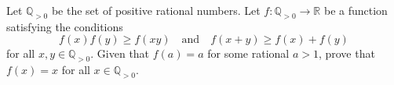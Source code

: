 Let $\mathbb{Q}_{>0}$ be the set of positive rational numbers. Let $f \colon \mathbb{Q}_{>0} \to \mathbb{R}$ be a function satisfying the conditions
\[
f(x)f(y) \geq f(xy) \quad \text{and} \quad f(x+y) \geq f(x) + f(y)
\]
for all $x, y \in \mathbb{Q}_{>0}$. Given that $f(a) = a$ for some rational $a > 1$, prove that $f(x) = x$ for all $x \in \mathbb{Q}_{>0}$.
